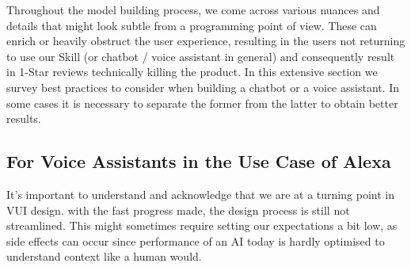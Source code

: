 \label{designbestprac}


Throughout the model building process, we come across various nuances and details that might look subtle from a programming point of view. %
These can enrich or %
heavily obstruct the user experience, resulting in the users not returning to use our Skill (or chatbot / voice assistant in general) %
and consequently result in 1-Star reviews technically killing the product.
%
In this extensive section we survey best practices to consider when building a chatbot or a voice assistant. In some cases it is necessary to separate the former from the latter to obtain better results.


\subsection*{For Voice Assistants in the Use Case of Alexa}
\label{designalexa:bestprac}





It's important to understand and acknowledge that we are at a turning point %
in VUI design.%
with the fast progress made, the design process is still %
not streamlined. %
This might sometimes require setting our expectations a bit low, as side effects can occur since%
performance of an AI today is hardly optimised to understand context like a human would. %
  
